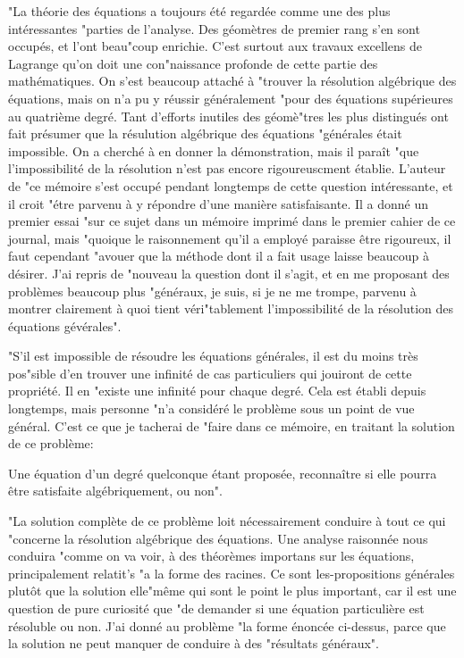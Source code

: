 \documentclass{article}
\begin{document}
"La théorie des équations a toujours été regardée comme une des plus intéressantes "parties de l'analyse. Des géomètres de premier rang s'en sont occupés, et l'ont beau"coup enrichie. C'est surtout aux travaux excellens de Lagrange qu'on doit une con"naissance profonde de cette partie des mathématiques. On s'est beaucoup attaché à "trouver la résolution algébrique des équations, mais on n'a pu y réussir généralement "pour des équations supérieures au quatrième degré. Tant d'efforts inutiles des géomè"tres les plus distingués ont fait présumer que la résulution algébrique des équations "générales était impossible. On a cherché à en donner la démonstration, mais il paraît "que l'impossibilité de la résolution n'est pas encore rigoureuscment établie. L'auteur de "ce mémoire s'est occupé pendant longtemps de cette question intéressante, et il croit "étre parvenu à y répondre d'une manière satisfaisante. Il a donné un premier essai "sur ce sujet dans un mémoire imprimé dans le premier cahier de ce journal, mais "quoique le raisonnement qu'il a employé paraisse être rigoureux, il faut cependant "avouer que la méthode dont il a fait usage laisse beaucoup à désirer. J'ai repris de "nouveau la question dont il s'agit, et en me proposant des problèmes beaucoup plus "généraux, je suis, si je ne me trompe, parvenu à montrer clairement à quoi tient véri"tablement l'impossibilité de la résolution des équations gévérales".

"S'il est impossible de résoudre les équations générales, il est du moins très pos"sible d'en trouver une infinité de cas particuliers qui jouiront de cette propriété. Il en
"existe une infinité pour chaque degré. Cela est établi depuis longtemps, mais personne "n'a considéré le problème sous un point de vue général. C'est ce que je tacherai de "faire dans ce mémoire, en traitant la solution de ce problème:

Une équation d'un degré quelconque étant proposée, reconnaître si elle pourra être satisfaite algébriquement, ou non".

"La solution complète de ce problème loit nécessairement conduire à tout ce qui "concerne la résolution algébrique des équations. Une analyse raisonnée nous conduira "comme on va voir, à des théorèmes importans sur les équations, principalement relatit's "a la forme des racines. Ce sont les-propositions générales plutôt que la solution elle"même qui sont le point le plus important, car il est une question de pure curiosité que "de demander si une équation particulière est résoluble ou non. J'ai donné au problème "la forme énoncée ci-dessus, parce que la solution ne peut manquer de conduire à des "résultats généraux".
\end{document}

